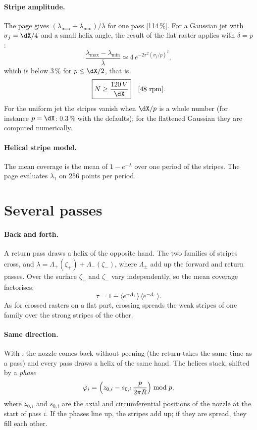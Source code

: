 \documentclass[11pt,a4paper]{article}
\begin{document}
\paragraph{Stripe amplitude.} The page gives $(\lambda_{\max}-\lambda_{\min})/\bar\lambda$ for one pass [114\,\%]. For a Gaussian jet with $\sigma_j=\dX/4$ and a small helix angle, the result of the flat raster applies with $\delta=p$:
\begin{equation}
\frac{\lambda_{\max}-\lambda_{\min}}{\bar\lambda}\simeq4\,e^{-2\pi^2(\sigma_j/p)^2},
\end{equation}
which is below 3\,\% for $p\le\dX/2$, that is
\begin{equation}
\boxed{N\ge\frac{120\,V}{\dX}}\quad[\text{48 rpm}].
\end{equation}
For the uniform jet the stripes vanish when $\dX/p$ is a whole number (for instance $p=\dX$: 0.3\,\% with the defaults); for the flattened Gaussian they are computed numerically.

\paragraph{Helical stripe model.} The mean coverage is the mean of $1-e^{-\lambda}$ over one period of the stripes. The page evaluates $\lambda_1$ on 256 points per period.

\section{Several passes}

\paragraph{Back and forth.} A return pass draws a helix of the opposite hand. The two families of stripes cross, and $\lambda=\Lambda_+(\zeta_+)+\Lambda_-(\zeta_-)$, where $\Lambda_\pm$ add up the forward and return passes. Over the surface $\zeta_+$ and $\zeta_-$ vary independently, so the mean coverage factorises:
\begin{equation}
\bar\tau=1-\bigl\langle e^{-\Lambda_+}\bigr\rangle\,\bigl\langle e^{-\Lambda_-}\bigr\rangle .
\end{equation}
As for crossed rasters on a flat part, crossing spreads the weak stripes of one family over the strong stripes of the other.

\paragraph{Same direction.} With , the nozzle comes back without peening (the return takes the same time as a pass) and every pass draws a helix of the same hand. The helices stack, shifted by a \emph{phase}
\begin{equation}
\varphi_i=\Bigl(z_{0,i}-s_{0,i}\,\frac{p}{2\pi R}\Bigr)\bmod p,
\end{equation}
where $z_{0,i}$ and $s_{0,i}$ are the axial and circumferential positions of the nozzle at the start of pass $i$. If the phases line up, the stripes add up; if they are spread, they fill each other.
\end{document}
